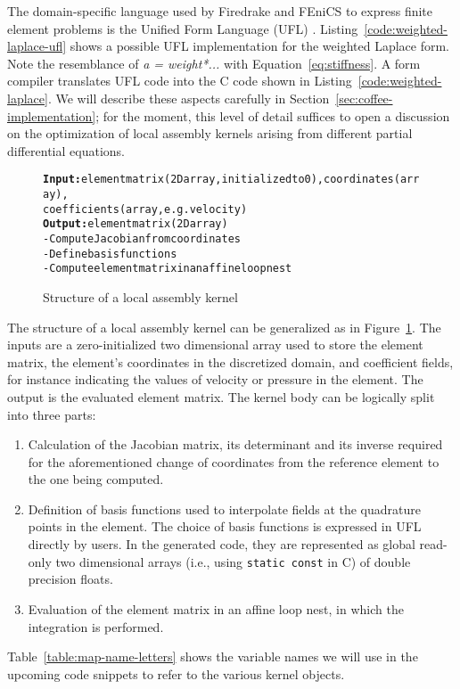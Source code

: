The domain-specific language used by Firedrake and FEniCS to express finite element problems is the Unified Form Language (UFL) \citep{ufl}. Listing~\ref{code:weighted-laplace-ufl} shows a possible UFL implementation for the weighted Laplace form. Note the resemblance of \emph{a = weight*...} with Equation~\ref{eq:stiffness}. A form compiler translates UFL code into the C code shown in Listing~\ref{code:weighted-laplace}. We will describe these aspects carefully in Section~\ref{sec:coffee-implementation}; for the moment, this level of detail suffices to open a discussion on the optimization of local assembly kernels arising from different partial differential equations.


\begin{figure}
\begin{alltt}
\scriptsize
\textbf{Input:} element matrix (2D array, initialized to 0), coordinates (array), 
       coefficients (array, e.g. velocity)
\textbf{Output:} element matrix (2D array)
- Compute Jacobian from coordinates
- Define basis functions
- Compute element matrix in an affine loop nest
\end{alltt}
\caption{Structure of a local assembly kernel}
\label{code:general-structure}
\end{figure}


The structure of a local assembly kernel can be generalized as in Figure~\ref{code:general-structure}. The inputs are a zero-initialized two dimensional array used to store the element matrix, the element's coordinates in the discretized domain, and coefficient fields, for instance indicating the values of velocity or pressure in the element. The output is the evaluated element matrix. The kernel body can be logically split into three parts:
\begin{enumerate}
  \item Calculation of the Jacobian matrix, its determinant and its
    inverse required for the aforementioned change of coordinates from
    the reference element to the one being computed.
  \item Definition of basis functions used to interpolate fields at the
    quadrature points in the element. The choice of basis functions is
    expressed in UFL directly by users. In the generated code, they are
    represented as global read-only two dimensional arrays (i.e., using
    \texttt{static const} in C) of double precision floats.
  \item Evaluation of the element matrix in an affine loop nest, in which
    the integration is performed.
\end{enumerate}
Table~\ref{table:map-name-letters} shows the variable names we will use in the upcoming code snippets to refer to the various kernel objects.

